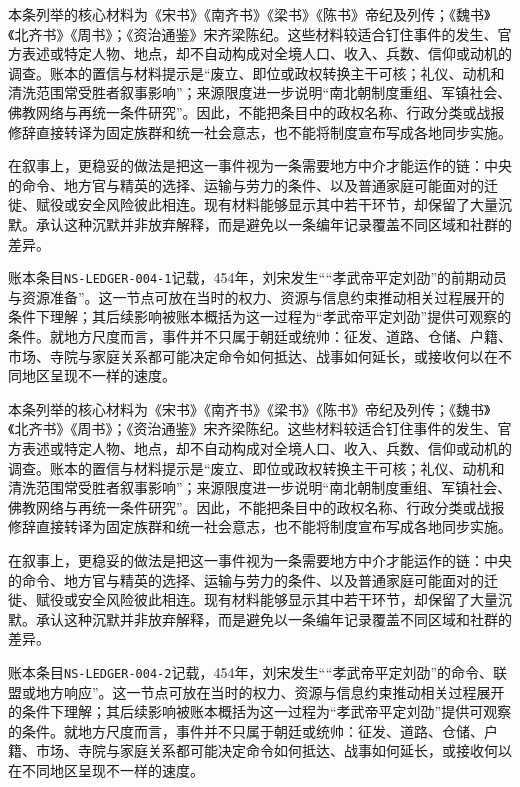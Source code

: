 本条列举的核心材料为《宋书》《南齐书》《梁书》《陈书》帝纪及列传；《魏书》《北齐书》《周书》；《资治通鉴》宋齐梁陈纪。这些材料较适合钉住事件的发生、官方表述或特定人物、地点，却不自动构成对全境人口、收入、兵数、信仰或动机的调查。账本的置信与材料提示是“废立、即位或政权转换主干可核；礼仪、动机和清洗范围常受胜者叙事影响”；来源限度进一步说明“南北朝制度重组、军镇社会、佛教网络与再统一条件研究”。因此，不能把条目中的政权名称、行政分类或战报修辞直接转译为固定族群和统一社会意志，也不能将制度宣布写成各地同步实施。

在叙事上，更稳妥的做法是把这一事件视为一条需要地方中介才能运作的链：中央的命令、地方官与精英的选择、运输与劳力的条件、以及普通家庭可能面对的迁徙、赋役或安全风险彼此相连。现有材料能够显示其中若干环节，却保留了大量沉默。承认这种沉默并非放弃解释，而是避免以一条编年记录覆盖不同区域和社群的差异。

账本条目\texttt{NS-LEDGER-004-1}记载，454年，刘宋发生““孝武帝平定刘劭”的前期动员与资源准备”。这一节点可放在当时的权力、资源与信息约束推动相关过程展开的条件下理解；其后续影响被账本概括为这一过程为“孝武帝平定刘劭”提供可观察的条件。就地方尺度而言，事件并不只属于朝廷或统帅：征发、道路、仓储、户籍、市场、寺院与家庭关系都可能决定命令如何抵达、战事如何延长，或接收何以在不同地区呈现不一样的速度。

本条列举的核心材料为《宋书》《南齐书》《梁书》《陈书》帝纪及列传；《魏书》《北齐书》《周书》；《资治通鉴》宋齐梁陈纪。这些材料较适合钉住事件的发生、官方表述或特定人物、地点，却不自动构成对全境人口、收入、兵数、信仰或动机的调查。账本的置信与材料提示是“废立、即位或政权转换主干可核；礼仪、动机和清洗范围常受胜者叙事影响”；来源限度进一步说明“南北朝制度重组、军镇社会、佛教网络与再统一条件研究”。因此，不能把条目中的政权名称、行政分类或战报修辞直接转译为固定族群和统一社会意志，也不能将制度宣布写成各地同步实施。

在叙事上，更稳妥的做法是把这一事件视为一条需要地方中介才能运作的链：中央的命令、地方官与精英的选择、运输与劳力的条件、以及普通家庭可能面对的迁徙、赋役或安全风险彼此相连。现有材料能够显示其中若干环节，却保留了大量沉默。承认这种沉默并非放弃解释，而是避免以一条编年记录覆盖不同区域和社群的差异。

账本条目\texttt{NS-LEDGER-004-2}记载，454年，刘宋发生““孝武帝平定刘劭”的命令、联盟或地方响应”。这一节点可放在当时的权力、资源与信息约束推动相关过程展开的条件下理解；其后续影响被账本概括为这一过程为“孝武帝平定刘劭”提供可观察的条件。就地方尺度而言，事件并不只属于朝廷或统帅：征发、道路、仓储、户籍、市场、寺院与家庭关系都可能决定命令如何抵达、战事如何延长，或接收何以在不同地区呈现不一样的速度。


